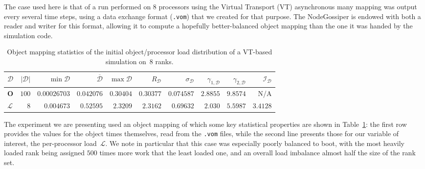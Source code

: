 The case used here is that of a run performed on 8 processors using
the \textsf{Virtual Transport} (\textsf{VT}) asynchronous many 
mapping was output every several time steps, using a data exchange
format (\texttt{.vom}) that we created for that purpose.
The \textsf{NodeGossiper} is endowed with both a reader and writer for
this format, allowing it to compute a hopefully better-balanced object
mapping than the one it was handed by the simulation code.

\begin{table}[htb!]
\begin{center}
\begin{tabular}{@{}lrrrrrrrrr@{}}
\hline
$\mathcal{D}$ &
$\vert\mathcal{D}\vert$ &
$\min{\mathcal{D}}$ & 
$\overline{\mathcal{D}}$ & 
$\max{\mathcal{D}}$ &
$R_{\mathcal{D}}$ &
$\sigma_{\mathcal{D}}$ &
$\gamma_{1,\mathcal{D}}$ &
$\gamma_{2,\mathcal{D}}$ &
$\mathcal{I}_{\mathcal{D}}$ \\
\hline\hline
\textbf{O} &
$100$     & $0.00026703$ & $0.042076$ & $0.30404$ &
$0.30377$ & $0.074587$   &$2.8855$    & $9.8574$ &
N/A \\\hline
$\mathcal{L}$ &
$8$      & $0.004673$ & $0.52595$ & $2.3209$ &
$2.3162$ & $0.69632$  & $2.030$   & $5.5987$ &
$3.4128$\\\hline
\end{tabular}
\end{center}
\caption{\label{t:vt-example} Object mapping statistics of the initial
object/processor load distribution of a \textsf{VT}-based simulation
on~8 ranks.}
\end{table}

The experiment we are presenting used an object mapping of which some
key statistical properties are shown in Table~\ref{t:vt-example}: the
first row provides the values for the object times themselves, read
from the \texttt{.vom} files, while the second line presents those for
our variable of interest, the per-processor load~$\mathcal{L}$.
We note in particular that this case was especially poorly balanced to
boot, with the most heavily loaded rank being assigned $500$ times
more work that the least loaded one, and an overall load imbalance
almost half the size of the rank set.

  
